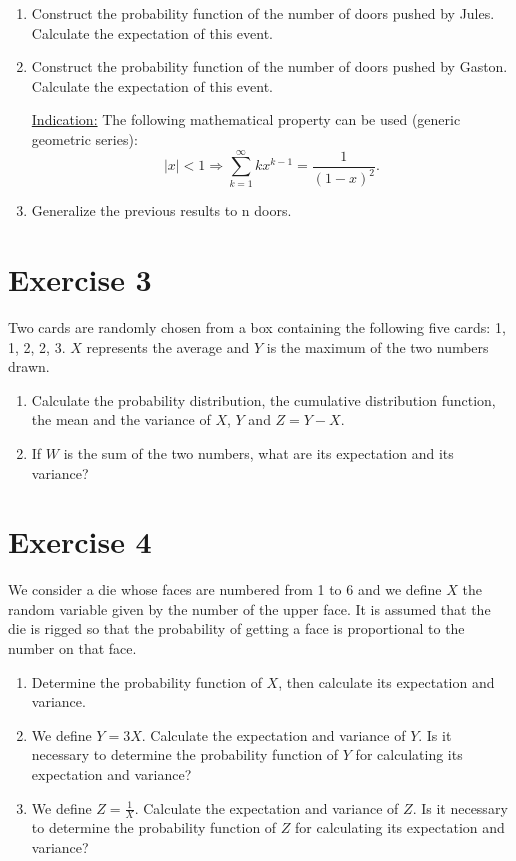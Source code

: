\documentclass[12pt,thmsa]{article}\usepackage[]{graphicx}\usepackage[]{color}
\begin{document}
\begin{enumerate}%
\item Construct the probability function of the number of doors pushed by Jules. Calculate the expectation of this event.
\item Construct the probability function of the number of doors pushed by Gaston. Calculate the expectation of this event.



\noindent \underline{Indication:} The following mathematical property can be used (generic geometric series):
$$|x|<1 \Rightarrow \sum_{k=1}^{\infty} k x^{k-1} = \frac{1}{(1-x)^2}.$$
\item Generalize the previous results to n doors.
\end{enumerate}

\newpage
\section*{Exercise 3} %

Two cards are randomly chosen from a box containing the following five cards: 1, 1, 2, 2, 3. $X$ represents the average and $Y$ is the maximum of the two numbers drawn.
\begin{enumerate}%
    \item Calculate the probability distribution, the cumulative distribution function, the mean and the variance of $X$, $Y$ and $Z = Y - X$.
    \item If $W$ is the sum of the two numbers, what are its expectation and its variance?
\end{enumerate}


\section*{Exercise 4} %

We consider a die whose faces are numbered from 1 to 6 and we define $X$ the random variable given by the number of the upper face. It is assumed that the die is rigged so that the probability of getting a face is proportional to the number on that face.

 \begin{enumerate}%
\item Determine the probability function of $X$, then calculate its expectation and variance.
\item We define $Y = 3X$. Calculate the expectation and variance of $Y$. Is it necessary to determine the probability function of $Y$ for calculating its expectation and variance?
\item We define $Z = \frac{1}{X}$. Calculate the expectation and variance of $Z$. Is it necessary to determine the probability function of $Z$ for calculating its expectation and variance?
\end{enumerate}
\end{document}
